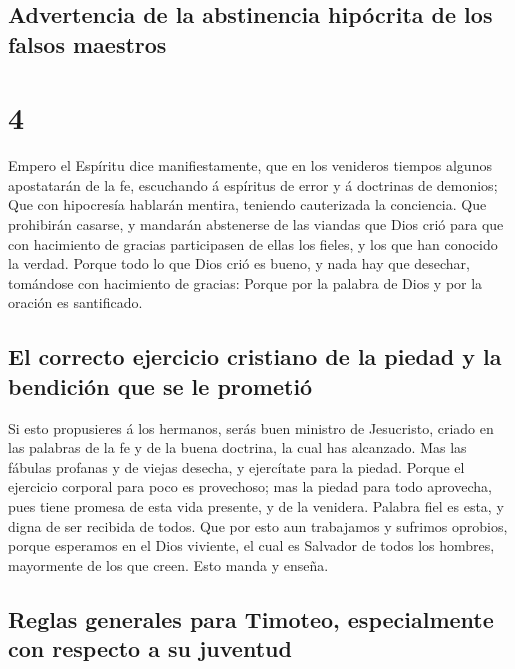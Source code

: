 \hypertarget{advertencia-de-la-abstinencia-hipuxf3crita-de-los-falsos-maestros}{%
\subsection{Advertencia de la abstinencia hipócrita de los falsos
maestros}\label{advertencia-de-la-abstinencia-hipuxf3crita-de-los-falsos-maestros}}

\hypertarget{section-3}{%
\section{4}\label{section-3}}

 Empero el Espíritu dice manifiestamente, que en los
venideros tiempos algunos apostatarán de la fe, escuchando á espíritus
de error y á doctrinas de demonios;  Que con hipocresía
hablarán mentira, teniendo cauterizada la conciencia.  Que
prohibirán casarse, y mandarán abstenerse de las viandas que Dios crió
para que con hacimiento de gracias participasen de ellas los fieles, y
los que han conocido la verdad.  Porque todo lo que Dios
crió es bueno, y nada hay que desechar, tomándose con hacimiento de
gracias:  Porque por la palabra de Dios y por la oración es
santificado.

\hypertarget{el-correcto-ejercicio-cristiano-de-la-piedad-y-la-bendiciuxf3n-que-se-le-prometiuxf3}{%
\subsection{El correcto ejercicio cristiano de la piedad y la bendición
que se le
prometió}\label{el-correcto-ejercicio-cristiano-de-la-piedad-y-la-bendiciuxf3n-que-se-le-prometiuxf3}}

 Si esto propusieres á los hermanos, serás buen ministro de
Jesucristo, criado en las palabras de la fe y de la buena doctrina, la
cual has alcanzado.  Mas las fábulas profanas y de viejas
desecha, y ejercítate para la piedad.  Porque el ejercicio
corporal para poco es provechoso; mas la piedad para todo aprovecha,
pues tiene promesa de esta vida presente, y de la venidera. 
Palabra fiel es esta, y digna de ser recibida de todos. 
Que por esto aun trabajamos y sufrimos oprobios, porque esperamos en el
Dios viviente, el cual es Salvador de todos los hombres, mayormente de
los que creen.  Esto manda y enseña.

\hypertarget{reglas-generales-para-timoteo-especialmente-con-respecto-a-su-juventud}{%
\subsection{Reglas generales para Timoteo, especialmente con respecto a
su
juventud}\label{reglas-generales-para-timoteo-especialmente-con-respecto-a-su-juventud}}

